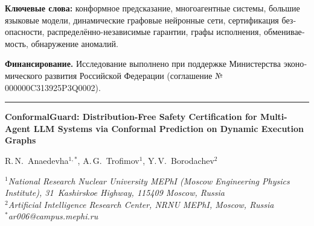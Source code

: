 \documentclass[12pt,a4paper]{article}
\theoremstyle{definition}
\theoremstyle{remark}
\newcommand{\modelname}{ConformalGuard}
\begin{document}
\begin{otherlanguage}{russian}
\vspace{0.4em}

\noindent\textbf{Ключевые слова:} конформное предсказание, многоагентные системы, большие языковые модели, динамические графовые нейронные сети, сертификация безопасности, распределённо-независимые гарантии, графы исполнения, обмениваемость, обнаружение аномалий.

\vspace{0.4em}

\noindent\textbf{Финансирование.} Исследование выполнено при поддержке Министерства экономического развития Российской Федерации (соглашение № 000000C313925P3Q0002).
\end{otherlanguage}

\vspace{1.0em}
\hrule
\vspace{0.6em}


\begin{center}
{\large\bfseries
\modelname{}: Distribution-Free Safety Certification for
Multi-Agent LLM Systems via Conformal Prediction on
Dynamic Execution Graphs
\par}

\vspace{0.6em}

{\normalsize
R.\,N.~Anaedevha$^{1,*}$, A.\,G.~Trofimov$^{1}$, Y.\,V.~Borodachev$^{2}$
\par}

\vspace{0.4em}

{\small\itshape
$^{1}$National Research Nuclear University MEPhI
(Moscow Engineering Physics Institute), 31~Kashirskoe Highway,
115409 Moscow, Russia\\
$^{2}$Artificial Intelligence Research Center, NRNU MEPhI, Moscow, Russia\\
$^{*}$ar006@campus.mephi.ru
\par}
\end{center}

\vspace{0.5em}
\end{document}
